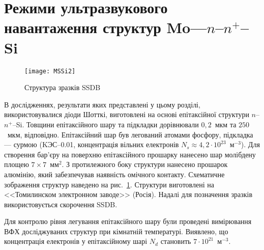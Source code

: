 \section{Режими ультразвукового навантаження структур Mo---$n$--$n^+$--Si\label{SSDB:Struc}}



\begin{figure}[b]
\center
\texttt{[image: MSSi2]}%
\caption{\label{figMSSi2}
Структура зразків SSDB
}
\end{figure}


В дослідженнях, результати яких представлені у цьому розділі, використовувалися діоди Шотткі, виготовлені на основі епітаксійної
структури $n$--$n^+$--Si.
Товщини епітаксійного шару та підкладки дорівнювали $0,2$~мкм та $250$~мкм, відповідно.
Епітаксійний шар був легований атомами фосфору, підкладка --- сурмою
(KЭС--0.01, концентрація вільних електронів $N_s\approx4,2\cdot10^{23}$~м$^{-3}$).
Для створення бар'єру на поверхню епітаксійного прошарку нанесено шар молібдену площею $7\times7$~мм$^2$.
З протилежного боку структури нанесено прошарок алюмінію, який забезпечував наявність омічного контакту.
Схематичне зображення структур наведено на рис.~\ref{figMSSi2}.
Структури виготовлені на <<Томилинском электронном заводе>>  (Росія).
Надалі для позначення зразків використовується скорочення SSDB.

Для контролю рівня легування епітаксійного шару були проведені
вимірювання ВФХ досліджуваних структур при кімнатній температурі.
Виявлено, що концентрація електронів у епітаксійному шарі $N_d$ становить $7\cdot10^{21}$~м$^{-3}$.


